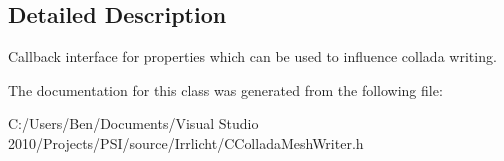 \subsection{Detailed Description}
Callback interface for properties which can be used to influence collada writing. 

The documentation for this class was generated from the following file\-:\begin{DoxyCompactItemize}
\item 
C\-:/\-Users/\-Ben/\-Documents/\-Visual Studio 2010/\-Projects/\-P\-S\-I/source/\-Irrlicht/C\-Collada\-Mesh\-Writer.\-h\end{DoxyCompactItemize}
